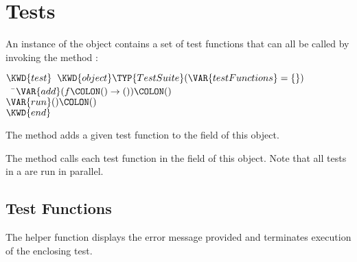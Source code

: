 %
%
%
%

\chapter{Tests}


An instance of the object  contains a set of test functions
that can all be called by invoking the method :
\begin{Fortress}
\(\KWD{test}\;\;\KWD{object} \TYP{TestSuite}(\VAR{testFunctions} = \{\})\)\\
{\tt~~}\pushtabs\=\+\(  \VAR{add}(f\COLON () \rightarrow ())\COLON ()\)\\
\(  \VAR{run}()\COLON ()\)\-\\\poptabs
\(\KWD{end}\)
\end{Fortress}


The  method adds a given test function to the 
field of this object.


The  method calls each test function in the 
field of this object.  Note that all tests in a  are run in
parallel. 


\section{Test Functions}


The helper function  displays the error message provided
and terminates execution of the enclosing test.
